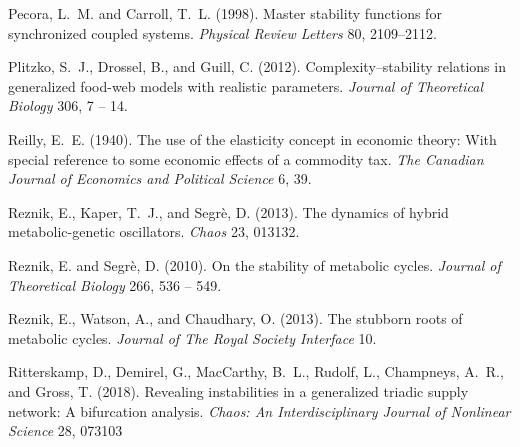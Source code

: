 \documentclass{article}
\begin{document}
\begin{thebibliography}{85}
Pecora, L.~M. and Carroll, T.~L. (1998).
\newblock Master stability functions for synchronized coupled systems.
\newblock \emph{Physical Review Letters} 80, 2109--2112.
\newblock {}

Plitzko, S.~J., Drossel, B., and Guill, C. (2012).
\newblock Complexity–stability relations in generalized food-web models with
  realistic parameters.
\newblock \emph{Journal of Theoretical Biology} 306, 7 -- 14.
\newblock {}

Reilly, E.~E. (1940).
\newblock The use of the elasticity concept in economic theory: With special
  reference to some economic effects of a commodity tax.
\newblock \emph{The Canadian Journal of Economics and Political Science} 6, 39.
\newblock {}

Reznik, E., Kaper, T.~J., and Segr{\`e}, D. (2013{}).
\newblock The dynamics of hybrid metabolic-genetic oscillators.
\newblock \emph{Chaos} 23, 013132.
\newblock {}

Reznik, E. and Segr{\`e}, D. (2010).
\newblock On the stability of metabolic cycles.
\newblock \emph{Journal of Theoretical Biology} 266, 536 -- 549.
\newblock {}

Reznik, E., Watson, A., and Chaudhary, O. (2013{}).
\newblock The stubborn roots of metabolic cycles.
\newblock \emph{Journal of The Royal Society Interface} 10.
\newblock {}

Ritterskamp, D., Demirel, G., MacCarthy, B.~L., Rudolf, L., Champneys, A.~R.,
  and Gross, T. (2018).
\newblock Revealing instabilities in a generalized triadic supply network: A
  bifurcation analysis.
\newblock \emph{Chaos: An Interdisciplinary Journal of Nonlinear Science} 28,
  073103


\end{thebibliography}
\end{document}
